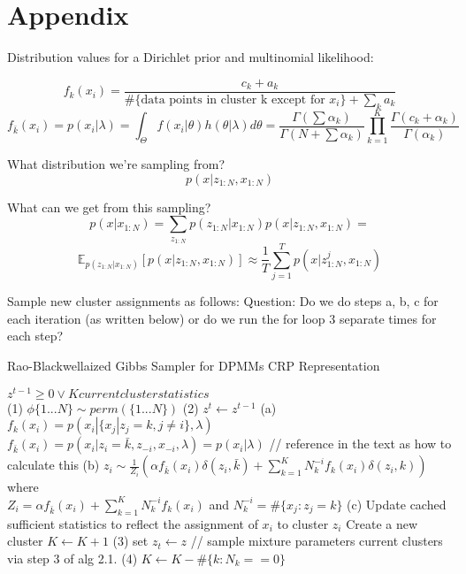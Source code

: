 \section{Appendix}

Distribution values for a Dirichlet prior and multinomial likelihood:

$$ f_k(x_i) = \frac{  c_k + a_k }{  \#\{ \text{data points in cluster k except for } x_i \} + \sum_k a_k }  $$
$$ f_{\bar{k}}(x_i) = p(x_i | \lambda) = \int_{\Theta} f(x_i | \theta) h(\theta | \lambda) d \theta = \frac{ \Gamma(\sum \alpha_k) }{\Gamma(N + \sum \alpha_k)} \prod_{k=1}^K \frac{\Gamma(c_k + \alpha_k)}{\Gamma(\alpha_k)}  $$


What distribution we're sampling from?
$$ p(x | z_{1:N}, x_{1:N}) $$ 

What can we get from this sampling?
$$p(x |  x_{1:N})  =  \sum_{z_{1:N}}  p(z_{1:N} | x_{1:N}) p (x | z_{1:N}, x_{1:N})  = $$
$$ \mathbb{E}_{p(z_{1:N} | x_{1:N})} [p (x | z_{1:N}, x_{1:N})]   \approx   \frac{1}{T} \sum_{j=1}^T  p(x|z_{1:N}^j, x_{1:N}  )   $$




Sample new cluster assignments as follows:
Question: Do we do steps a, b, c for each iteration (as written below) or do we run the for loop 3 separate times for each step?
\begin{algorithm}
\caption{Rao-Blackwellaized Gibbs Sampler for DPMMs CRP Representation \cite{Sudderth:aa}}
\begin{algorithmic} 
\REQUIRE $z^{t-1} \geq 0 \vee K current cluster statistics$ \\
\STATE (1) $\phi\{1...N\} \sim perm(\{1...N\})$
\STATE (2) $z^{t} \leftarrow z^{t-1} $
\STATE (a)
\STATE $f_{k}(x_i) = p(x_i | \{x_j | z_j = k, j \neq i\}, \lambda)$ 
\ENDFOR
\STATE $f_{\bar{k}}(x_i) = p(x_i | z_i = \bar{k}, z_{-i}, x_{-i}, \lambda) = p(x_i | \lambda)$ // reference in the text as how to calculate this
\STATE (b) $z_i \sim \frac{1}{Z_i} (  \alpha f_{\bar{k}}(x_i) \delta(z_i, \bar{k}) + \sum_{k=1}^K N_k^{-i}  f_k(x_i) \delta(z_i, k) ) $ where \\
$ Z_i = \alpha f_{\bar{k}}(x_i) + \sum_{k=1}^K N_k^{-i} f_k(x_i)  $ and $ N_k^{-i} = \# \{x_j : z_j = k\} $
\STATE (c) Update cached sufficient statistics to reflect the assignment of $x_i$ to cluster $z_i$
\STATE Create a new cluster
\STATE $K \leftarrow K + 1$
\ENDIF 
\ENDFOR 
\STATE (3) set $ z_t \leftarrow z$ // sample mixture parameters current clusters via step 3 of alg 2.1. \cite{Sudderth:aa}
\STATE (4) $K \leftarrow K - \#\{ k : N_k == 0 \} $
\end{algorithmic}
\end{algorithm}


